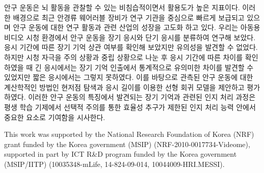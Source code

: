 \documentclass[oneside,master]{snueethesis}
\begin{document}



\begin{abstractalt}
안구 운동은 뇌 활동을 관찰할 수 있는 비침습적이면서 활용도가 높은 지표이다. 이러한 배경으로 최근 안경류 웨어러블 장비가 연구 기관을 중심으로 빠르게 보급되고 있으며 안구 운동에 대한 연구 활동과 관련 산업의 성장을 고도화 하고 있다. 우리는 아동용 비디오 시청 환경에서 안구 운동을 장기 응시와 단기 응시를 분류하여 연구해 보았다. 응시 기간에 따른 장기 기억 상관 여부를 확인해 보았지만 유의성을 발견할 수 없었다. 하지만 시청 자극을 주의 상황과 중립 상황으로 나눈 후 응시 기간에 따른 차이를 확인 하였을 때 긴 응시에서는 장기 기억 인출에서 통계적으로 유의미한 차이를 발견할 수 있었지만 짧은 응시에서는 그렇지 못하였다. 이를 바탕으로 관측된 안구 운동에 대한 계산학적인 방법인 현저점 탐색과 응시 길이를 이용한 선형 회귀 모델을 제안하고 평가하였다. 이러한 안구 운동의 특징에서 발견되는 장기 기억과 관련된 인지 처리 과정은 평생 학습 기제에서 선택적 주의를 통한 효율성 추구가 제한된 인지 처리 능력 안에서 중요한 요소로 기여함을 시사한다.
\end{abstractalt}

\acknowledgement
This work was supported by the National Research Foundation of Korea (NRF) grant funded by the Korea government (MSIP) (NRF-2010-0017734-Videome),
supported in part by ICT R\&D program funded by the Korea government (MSIP/IITP) (10035348-mLife, 14-824-09-014, 10044009-HRI.MESSI).
\end{document}
